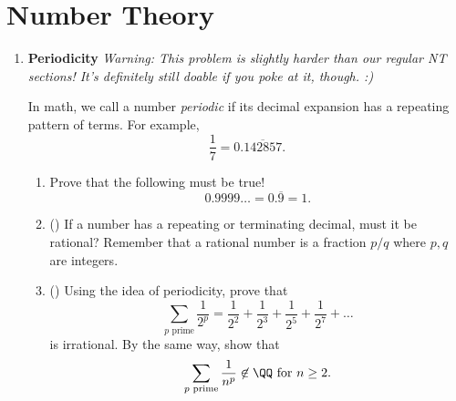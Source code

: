 \documentclass[11pt]{scrartcl}
\begin{document}
\section{Number Theory}
\begin{enumerate}[label=\textbf{N\arabic*}.]
    \item \textbf{Periodicity} \newline
    \textit{Warning: This problem is slightly harder than our regular NT sections! It's definitely still doable if you poke at it, though. :)}
    
    In math, we call a number \textit{periodic} if its decimal expansion has a repeating pattern of terms. For example,
    \[ \frac{1}{7} = 0.\overline{142857}. \] 
    
    \begin{enumerate}
        \item Prove that the following must be true!
        \[ 0.9999\dots = 0.\overline{9} = 1. \]
        
        \item (\fullchili) If a number has a repeating or terminating decimal, must it be rational? Remember that a rational number is a fraction $p/q$ where $p, q$ are integers.
        
        \item (\fullchili) Using the idea of periodicity, prove that
        \[ \sum_{p \text{ prime}} \frac{1}{2^p} = \frac{1}{2^2} + \frac{1}{2^3} + \frac{1}{2^5} + \frac{1}{2^7} + \dots \]
        is irrational. By the same way, show that
        \[ \sum_{p \text{ prime}} \frac{1}{n^p} \not\in \QQ \text{ for } n \geq 2. \]
    \end{enumerate}
    
\end{enumerate}
\end{document}

